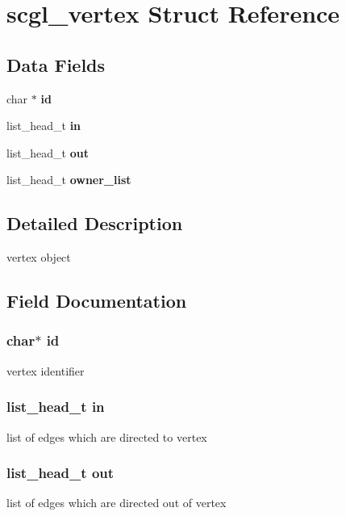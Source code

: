 \section{scgl\-\_\-vertex Struct Reference}
\label{structscgl__vertex}
\subsection*{Data Fields}
\begin{DoxyCompactItemize}
\item 
char $\ast$ {\bf id}
\item 
list\-\_\-head\-\_\-t {\bf in}
\item 
list\-\_\-head\-\_\-t {\bf out}
\item 
list\-\_\-head\-\_\-t {\bf owner\-\_\-list}
\end{DoxyCompactItemize}


\subsection{Detailed Description}
vertex object 

\subsection{Field Documentation}
\subsubsection[{id}]{\setlength{\rightskip}{0pt plus 5cm}char$\ast$ {\bf id}}\label{structscgl__vertex_aecb3b0d045ada529257a2fbf8f829599}
vertex identifier 
\subsubsection[{in}]{\setlength{\rightskip}{0pt plus 5cm}list\-\_\-head\-\_\-t {\bf in}}\label{structscgl__vertex_a3d3ac2f2ff7304c654a6efda253150f8}
list of edges which are directed to vertex 
\subsubsection[{out}]{\setlength{\rightskip}{0pt plus 5cm}list\-\_\-head\-\_\-t {\bf out}}\label{structscgl__vertex_aafefec4eef19815c5105c63e71cee418}
list of edges which are directed out of vertex 
